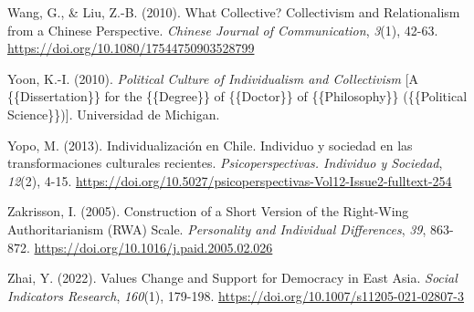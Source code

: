 \documentclass[
  12pt,
  letterpaper,
  DIV=11,
  numbers=noendperiod]{scrartcl}
\newlength{\cslhangindent}
\newenvironment{CSLReferences}[2] %
 {\begin{list}{}{%
  \setlength{\itemindent}{0pt}
  \setlength{\leftmargin}{0pt}
  \setlength{\parsep}{0pt}
  \ifodd #1
   \setlength{\leftmargin}{\cslhangindent}
   \setlength{\itemindent}{-1\cslhangindent}
  \fi
  \setlength{\itemsep}{#2\baselineskip}}}
 {\end{list}}
\begin{document}
\begin{CSLReferences}{1}{0}
Wang, G., \& Liu, Z.-B. (2010). What Collective? {Collectivism} and
Relationalism from a {Chinese} Perspective. \emph{Chinese Journal of
Communication}, \emph{3}(1), 42-63.
\url{https://doi.org/10.1080/17544750903528799}

Yoon, K.-I. (2010). \emph{Political {Culture} of {Individualism} and
{Collectivism}} {[}A \{\{Dissertation\}\} for the \{\{Degree\}\} of
\{\{Doctor\}\} of \{\{Philosophy\}\} (\{\{Political Science\}\}){]}.
Universidad de Michigan.

Yopo, M. (2013). {Individualizaci{ó}n en Chile. Individuo y sociedad en
las transformaciones culturales recientes}. \emph{Psicoperspectivas.
Individuo y Sociedad}, \emph{12}(2), 4-15.
\url{https://doi.org/10.5027/psicoperspectivas-Vol12-Issue2-fulltext-254}

Zakrisson, I. (2005). Construction of a Short Version of the {Right-Wing
Authoritarianism} ({RWA}) {Scale}. \emph{Personality and Individual
Differences}, \emph{39}, 863-872.
\url{https://doi.org/10.1016/j.paid.2005.02.026}

Zhai, Y. (2022). Values {Change} and {Support} for {Democracy} in {East
Asia}. \emph{Social Indicators Research}, \emph{160}(1), 179-198.
\url{https://doi.org/10.1007/s11205-021-02807-3}

\end{CSLReferences}
\end{document}
